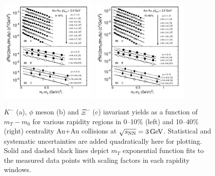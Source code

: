 \documentclass[aps,tightenlines,superscriptaddress,twocolumn]{revtex4-1}
\begin{document}

\begin{figure}
\centering
\includegraphics[width=0.43\textwidth]{fig21-eps-converted-to.pdf}
\includegraphics[width=0.43\textwidth]{fig22-eps-converted-to.pdf}
\caption{$K^-$ (a), $\phi$ meson (b) and $\Xi^-$ (c) invariant yields as a function of $m_T-m_0$ for various rapidity regions in 0--10\% (left) and  10--40\% (right) centrality Au+Au collisions at ${\sqrt{s_{\rm NN}} = \rm{3\,GeV}}$. Statistical and systematic uncertainties are added quadratically here for plotting. Solid and dashed black lines depict $m_T$ exponential function fits to the measured data points with scaling factors in each rapidity windows.}
\label{fig:phimTSpectra21}
\end{figure}
\end{document}
